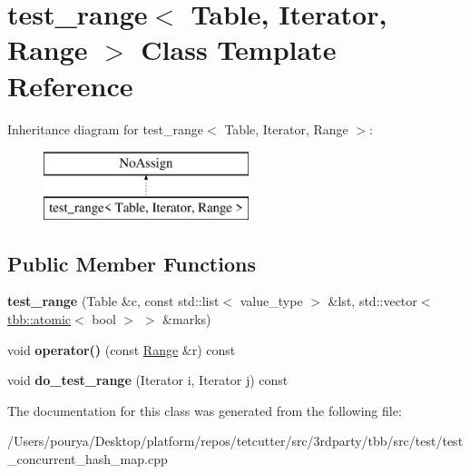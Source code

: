 \hypertarget{classtest__range}{}\section{test\+\_\+range$<$ Table, Iterator, Range $>$ Class Template Reference}
\label{classtest__range}
Inheritance diagram for test\+\_\+range$<$ Table, Iterator, Range $>$\+:\begin{figure}[H]
\begin{center}
\leavevmode
\includegraphics[height=2.000000cm]{classtest__range}
\end{center}
\end{figure}
\subsection*{Public Member Functions}
\begin{DoxyCompactItemize}
\item 
\hypertarget{classtest__range_aeb5fc71919c89127ae3a5bc05123d2ff}{}{\bfseries test\+\_\+range} (Table \&c, const std\+::list$<$ value\+\_\+type $>$ \&lst, std\+::vector$<$ \hyperlink{structtbb_1_1atomic}{tbb\+::atomic}$<$ bool $>$ $>$ \&marks)\label{classtest__range_aeb5fc71919c89127ae3a5bc05123d2ff}

\item 
\hypertarget{classtest__range_a7b5397d2ea20f14bcb0ad0b31a9daa74}{}void {\bfseries operator()} (const \hyperlink{classtbb_1_1blocked__range}{Range} \&r) const \label{classtest__range_a7b5397d2ea20f14bcb0ad0b31a9daa74}

\item 
\hypertarget{classtest__range_a0ecbc05a26aa8521ab778d075826f144}{}void {\bfseries do\+\_\+test\+\_\+range} (Iterator i, Iterator j) const \label{classtest__range_a0ecbc05a26aa8521ab778d075826f144}

\end{DoxyCompactItemize}


The documentation for this class was generated from the following file\+:\begin{DoxyCompactItemize}
\item 
/\+Users/pourya/\+Desktop/platform/repos/tetcutter/src/3rdparty/tbb/src/test/test\+\_\+concurrent\+\_\+hash\+\_\+map.\+cpp\end{DoxyCompactItemize}
